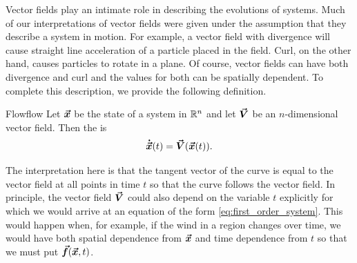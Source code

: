         Vector fields play an intimate role in describing the evolutions of systems. Much of our interpretations of vector fields were given under the assumption that they describe a system in motion. For example, a vector field with divergence will cause straight line acceleration of a particle placed in the field. Curl, on the other hand, causes particles to rotate in a plane. Of course, vector fields can have both divergence and curl and the values for both can be spatially dependent. To complete this description, we provide the following definition.

        \begin{df}{Flow}{flow}
        Let $\boldsymbol{\vec{x}}$ be the state of a system in $\mathbb{R}^n$ and let $\boldsymbol{\vec{V}}$ be an $n$-dimensional vector field. Then the  is
    \begin{equation}
    \boldsymbol{\dot{\vec{x}}}(t)= \boldsymbol{\vec{V}}(\boldsymbol{\vec{x}}(t)).
    \end{equation}
        \end{df}

        The interpretation here is that the tangent vector of the curve is equal to the vector field at all points in time $t$ so that the curve follows the vector field. In principle, the vector field $\boldsymbol{\vec{V}}$ could also depend on the variable $t$ explicitly for which we would arrive at an equation of the form \cref{eq:first_order_system}. This would happen when, for example, if the wind in a region changes over time, we would have both spatial dependence from $\boldsymbol{\vec{x}}$ and time dependence from $t$ so that we must put $\boldsymbol{\vec{f}}(\boldsymbol{\vec{x}},t)$.

